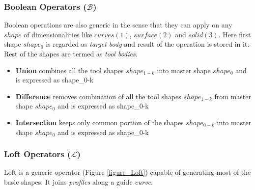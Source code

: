 \subsubsection{Boolean Operators ($\mathcal{B}$)}

Boolean operations are also generic in the sense that they can apply on any $shape$ of dimensionalities like $curves(1)$, $surface(2)$ and $solid(3)$. 
Here first shape $shape_0$ is regarded as {\em target body} and result of the operation is stored in it. Rest of the shapes are termed as {\em tool bodies}.

\begin{itemize}[noitemsep,topsep=2pt,parsep=2pt,partopsep=2pt,label={},leftmargin=*]
\item {\bf Union} combines all the tool shapes ${shape_{1-k}}$ into master shape $shape_0$ and is expressed as	 {shape_{0-k}} 	
\item {\bf Difference} removes combination of all the tool shapes ${shape_{1-k}}$ from master shape $shape_0$ and is expressed as	 {shape_{0-k}}  
\item {\bf Intersection} keeps only common portion of the shapes ${shape_{0-k}}$ into master shape $shape_0$ and is expressed as	 {shape_{0-k}} 	 
\end{itemize}


\subsubsection{Loft Operators ($\mathcal{L}$)}

Loft is a generic operator (Figure \ref{figure_Loft})  capable of generating most of the basic shapes. It joins {\em profiles} along a guide {\em curve}. 

